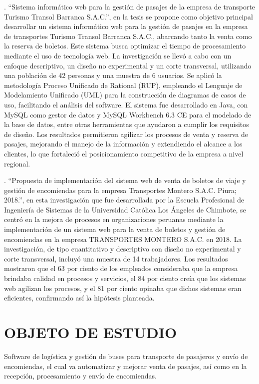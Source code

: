 	\textcite{sosa2019sistema}. ``Sistema informático web para la gestión de pasajes de la empresa de transporte Turismo Transol Barranca S.A.C.'', en la tesis se propone como objetivo principal desarrollar un sistema informático web para la gestión de pasajes en la empresa de transportes Turismo Transol Barranca S.A.C., abarcando tanto la venta como la reserva de boletos. Este sistema busca optimizar el tiempo de procesamiento mediante el uso de tecnología web. La investigación se llevó a cabo con un enfoque descriptivo, un diseño no experimental y un corte transversal, utilizando una población de 42 personas y una muestra de 6 usuarios. Se aplicó la metodología Proceso Unificado de Rational (RUP), empleando el Lenguaje de Modelamiento Unificado (UML) para la construcción de diagramas de casos de uso, facilitando el análisis del software. El sistema fue desarrollado en Java, con MySQL como gestor de datos y MySQL Workbench 6.3 CE para el modelado de la base de datos, entre otras herramientas que ayudaron a cumplir los requisitos de diseño. Los resultados permitieron agilizar los procesos de venta y reserva de pasajes, mejorando el manejo de la información y extendiendo el alcance a los clientes, lo que fortaleció el posicionamiento competitivo de la empresa a nivel regional.
	
	\textcite{vivas2019propuesta}. ``Propuesta de implementación del sistema web de venta de boletos de viaje y gestión de encomiendas para la empresa Transportes Montero S.A.C. Piura; 2018.'', en esta investigación que fue desarrollada por la Escuela Profesional de Ingeniería de Sistemas de la Universidad Católica Los Ángeles de Chimbote, se centró en la mejora de procesos en organizaciones peruanas mediante la implementación de un sistema web para la venta de boletos y gestión de encomiendas en la empresa TRANSPORTES MONTERO S.A.C. en 2018. La investigación, de tipo cuantitativo y descriptivo con diseño no experimental y corte transversal, incluyó una muestra de 14 trabajadores. Los resultados mostraron que el 63 por ciento de los empleados consideraba que la empresa brindaba calidad en procesos y servicios, el 84 por ciento creía que los sistemas web agilizan los procesos, y el 81 por ciento opinaba que dichos sistemas eran eficientes, confirmando así la hipótesis planteada.
	
\section{OBJETO DE ESTUDIO}

	Software de logística y gestión de buses para transporte de pasajeros y envío de encomiendas, el cual va automatizar y mejorar venta de pasajes, así como en la recepción, procesamiento y envío de encomiendas.
	
